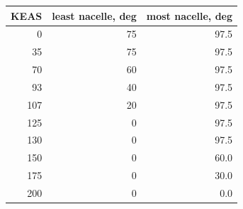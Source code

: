 \begin{tabular}{@{}rrr@{}}
\toprule
KEAS & least nacelle, deg & most nacelle, deg \\
\midrule
0 & 75 & 97.5 \\
35 & 75 & 97.5 \\
70 & 60 & 97.5 \\
93 & 40 & 97.5 \\
107 & 20 & 97.5 \\
125 & 0 & 97.5 \\
130 & 0 & 97.5 \\
150 & 0 & 60.0 \\
175 & 0 & 30.0 \\
200 & 0 & 0.0 \\
\bottomrule
\end{tabular}
